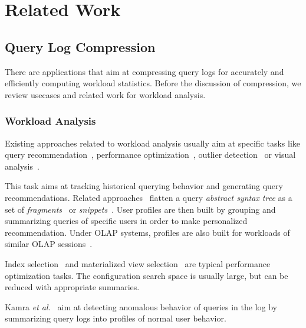 \chapter{Related Work}\label{chap:relatedwork}

\section{Query Log Compression}
There are applications that aim at compressing query logs for accurately and efficiently computing workload statistics.
Before the discussion of compression, we review usecases and related work for workload analysis.

\subsection{Workload Analysis}
Existing approaches related to workload analysis usually aim at specific tasks like query recommendation~\cite{DBLP:conf/icdm/MittalVCEP10,DBLP:journals/jdwm/GiacomettiMNS11,DBLP:journals/pvldb/KhoussainovaKBS11,DBLP:conf/icde/YangPS09,DBLP:journals/kais/AligonGMRT14}, performance optimization~\cite{DBLP:conf/adbis/AouicheJD06,DBLP:conf/sigmod/BrunoCG01}, outlier detection~\cite{DBLP:journals/vldb/KamraTB08} or visual analysis~\cite{DBLP:conf/simbig/MakiyamaRS15}. 

This task aims at tracking historical querying behavior and generating query recommendations.
Related approaches~\cite{DBLP:conf/icdm/MittalVCEP10,DBLP:journals/pvldb/KhoussainovaKBS11} flatten a query \textit{abstract syntax tree} as a set of \textit{fragments}~\cite{DBLP:conf/icdm/MittalVCEP10} or \textit{snippets}~\cite{DBLP:journals/pvldb/KhoussainovaKBS11}.
User profiles are then built by grouping and summarizing queries of specific users in order to make personalized recommendation. 
Under OLAP systems, profiles are also built for workloads of similar OLAP sessions~\cite{DBLP:journals/kais/AligonGMRT14}.

Index selection~\cite{DBLP:conf/vldb/ChaudhuriN97,DBLP:journals/tods/FinkelsteinST88} and materialized view selection~\cite{DBLP:conf/vldb/AgrawalCN00,DBLP:conf/adbis/AouicheJD06,DBLP:conf/sigmod/BrunoCG01} are typical performance optimization tasks.
The configuration search space is usually large, but can be reduced with appropriate summaries.

Kamra \textit{et al.}~\cite{DBLP:journals/vldb/KamraTB08} aim at detecting anomalous behavior of queries in the log by summarizing query logs into profiles
of normal user behavior.

